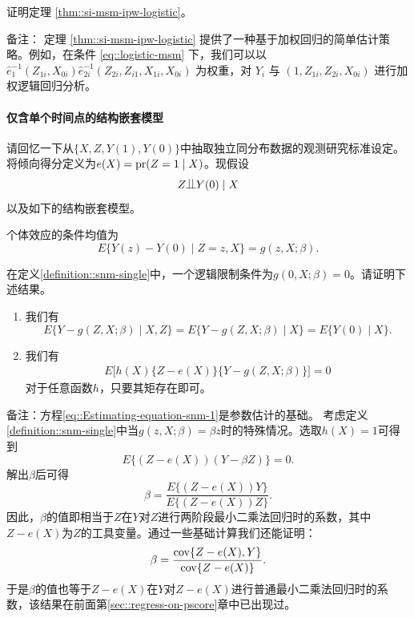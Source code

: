 证明定理 \ref{thm::si-msm-ipw-logistic}。 

备注：  
定理 \ref{thm::si-msm-ipw-logistic} 提供了一种基于加权回归的简单估计策略。例如，在条件 \eqref{eq::logistic-msm} 下，我们可以以 $\hat{e}_{1}^{-1}(Z_{1i}, X_{0i})  \hat{e}_{2i}^{-1}(Z_{2i}, Z_{i1}, X_{1i}, X_{0i})$ 为权重，对 $Y_i$ 与 $(1,Z_{1i}, Z_{2i}, X_{0i})$ 进行加权逻辑回归分析。 

 




\paragraph{仅含单个时间点的结构嵌套模型}\label{problem::snm-single-time}

 

请回忆一下从$\{ X,Z, Y(1), Y(0)\}$中抽取独立同分布数据的观测研究标准设定。将倾向得分定义为$e(X) = \textup{pr}(Z=1\mid X)$。现假设$$
Z\ind Y(0)\mid X
$$以及如下的结构嵌套模型。


\begin{definition}
[仅含单个时间点的结构嵌套模型]
\label{definition::snm-single}
个体效应的条件均值为
$$
E\{  Y(z) - Y(0)\mid Z=z, X \} = g(z,X;\beta).
$$
\end{definition}

在定义\ref{definition::snm-single}中，一个逻辑限制条件为$g(0,X;\beta) = 0$。请证明下述结果。


\begin{enumerate}
\item
我们有
$$
E\{  Y - g(Z,X;\beta) \mid X, Z\} = E\{  Y - g(Z,X;\beta) \mid X\}  = E\{  Y(0) \mid X\}. 
$$


\item
我们有
\begin{eqnarray}\label{eq::Estimating-equation-snm-1}
E\Big [  h(X)  \{ Z-e(X) \}   \{  Y - g(Z,X;\beta) \}  \Big ] = 0
\end{eqnarray}
对于任意函数$h$，只要其矩存在即可。
\end{enumerate}

 


备注：方程\eqref{eq::Estimating-equation-snm-1}是参数估计的基础。  
考虑定义\ref{definition::snm-single}中当$g(z,X;\beta) = \beta z$时的特殊情况。选取$h(X) = 1$可得到  
$$
E\{   (Z-e(X))   (Y-  \beta Z) \}  = 0.
$$  
解出$\beta$后可得  
$$
\beta = \frac{   E\{ (Z-e(X)) Y \}   }{   E\{ (Z-e(X))  Z\}   }.
$$  
因此，$\beta$的值即相当于$Z$在$Y$对$Z$进行两阶段最小二乘法回归时的系数，其中$Z-e(X)$为$Z$的工具变量。通过一些基础计算我们还能证明：  
$$
\beta = \frac{   \textup{cov}\{ Z-e(X), Y\}   }{ \textup{cov}\{ Z-e(X) \}  }.
$$  
于是$\beta$的值也等于$Z-e(X)$在$Y$对$Z-e(X)$进行普通最小二乘法回归时的系数，该结果在前面第\ref{sec::regress-on-pscore}章中已出现过。 

